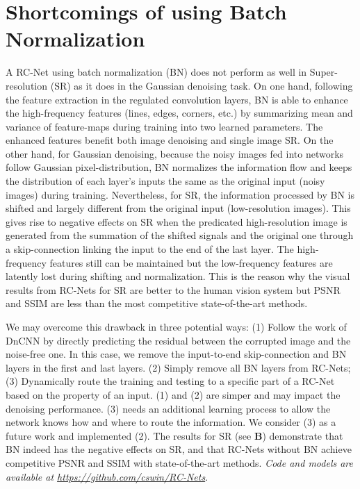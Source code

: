 \documentclass[10pt,twocolumn,letterpaper]{article}
\begin{document}
 
{\small


}

\newpage
 
\appendix


\section{Shortcomings of using Batch Normalization}


A RC-Net using batch normalization (BN) does not perform as well in Super-resolution (SR) as it does in the Gaussian denoising task. On one hand, following the feature extraction in the regulated convolution layers, BN is able to enhance the high-frequency features (lines, edges, corners, etc.)  by summarizing mean and variance of feature-maps during training into two learned parameters. The enhanced features benefit both image denoising and single image SR. On the other hand, for Gaussian denoising, because the noisy images fed into networks follow Gaussian pixel-distribution, BN normalizes the information flow and keeps the distribution of each layer's inputs the same as the original input (noisy images) during training. Nevertheless, for SR, the information processed by BN is shifted and largely different from the original input (low-resolution images). This gives rise to negative effects on SR when the predicated high-resolution image is generated from the summation of the shifted signals and the original one through a skip-connection linking the input to the end of the last layer. The high-frequency features still can be maintained but the low-frequency features are latently lost during shifting and normalization. 
This is the reason why the visual results from RC-Nets for SR are better to the human vision system but PSNR and SSIM are less than the most competitive state-of-the-art methods.

We may overcome this drawback in three potential ways: (1) Follow the work of DnCNN by directly predicting the residual between the corrupted image and the noise-free one. In this case, we remove the input-to-end skip-connection and BN layers in the first and last layers.  (2) Simply remove all BN layers from RC-Nets; (3) Dynamically route the training and testing to a specific part of a RC-Net based on the property of an input. (1) and (2) are simper and may impact the denoising performance. (3) needs an additional learning process to allow the network knows how and where to route the information. We consider (3) as a future work and implemented (2). The results for SR (see \textbf{B}) demonstrate that BN indeed has the negative effects on SR, and that RC-Nets without BN achieve competitive PSNR and SSIM with state-of-the-art methods.   
\textit{Code and models are available at \url{https://github.com/cswin/RC-Nets}}.
\end{document}
